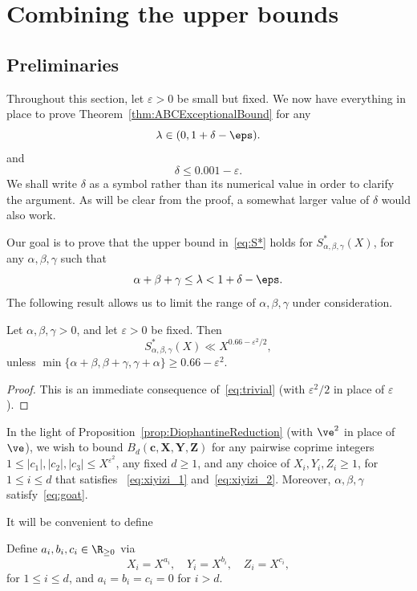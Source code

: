 \chapter{Combining the upper bounds}

\section{Preliminaries}

Throughout this section, let $\varepsilon>0$ be small but fixed.
We now have everything in place to prove Theorem~\ref{thm:ABCExceptionalBound} for any
\[
\lambda\in (0,1+\delta-\eps).
\]
and
\[\delta\le 0.001-\varepsilon.\]
We shall write $\delta$ as a symbol rather than its numerical value in order to clarify the argument.
As will be clear from the proof, a somewhat larger value of $\delta$ would also work.

Our goal is to prove that the upper bound in~\eqref{eq:S*} holds for $S^{*}_{\alpha,\beta,\gamma}(X)$,
for any $\alpha,\beta,\gamma$ such that
\begin{equation}\label{eq:goat}
\alpha+\beta+\gamma\le \lambda < 1+\delta -\eps.
\end{equation}
The following result allows us to limit the range of $\alpha,\beta,\gamma$ under consideration.

\begin{proposition}\label{prop:TrivialBoundforSstar}
  Let $\alpha,\beta,\gamma>0$, and let $\varepsilon>0$ be fixed. Then
  \[
  S^*_{\alpha,\beta,\gamma}(X)\ll X^{0.66-\varepsilon^2/2},
  \]
  unless $\min\{\alpha+\beta, \beta+\gamma,\gamma+\alpha\}\geq 0.66-\varepsilon^2$.
\end{proposition}
\begin{proof}
  This is an immediate consequence of~\eqref{eq:trivial} (with $\varepsilon^2/2$ in place of $\varepsilon$).
\end{proof}


In the light of Proposition~\ref{prop:DiophantineReduction} (with $\ve^2$ in place of $\ve$), we wish to bound $B_d(\mathbf{c},\mathbf{X},\mathbf{Y},\mathbf{Z})$ for any
 pairwise coprime integers $1\leq |c_1|,|c_2|,|c_3|\leq X^{\varepsilon^2}$, any fixed $d\geq 1$,
 and any choice of
 $X_i,Y_i,Z_i\geq 1$, for $1\leq i\leq d$ that satisfies
~\eqref{eq:xiyizi_1} and~\eqref{eq:xiyizi_2}.
 Moreover,
 $
 \alpha,\beta,\gamma
 $ satisfy~\eqref{eq:goat}.

It will be convenient to define
\begin{definition}\label{def:aibici}
  Define $a_i,b_i,c_i\in \R_{\geq0}$ via
  \[
  X_i=X^{a_i}, \quad Y_i=X^{b_i}, \quad Z_i=X^{c_i},
  \]
  for $1\leq i\leq d$, and $a_i=b_i=c_i=0$ for $i>d$.
\end{definition}

